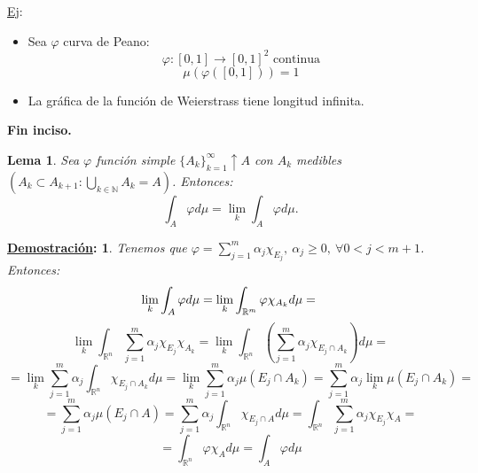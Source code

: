 \documentclass[10pt,a4paper,openright]{book}
\theoremstyle{break}
\newtheorem*{lema}{Lema}
\newtheorem*{demo}{\underline{Demostración}:}
\begin{document}
\underline{Ej}:
\begin{itemize}
    \item Sea $\varphi$ curva de Peano:
    $$\varphi: \left[0, 1\right] \rightarrow \left[0, 1\right]^2 \text{ continua}$$
    $$\mu\left(\varphi\left(\left[0, 1\right]\right)\right) = 1$$
    \item La gráfica de la función de Weierstrass tiene longitud infinita.
\end{itemize}
\textbf{Fin inciso.}
\newpage
\begin{lema}
Sea $\varphi$ función simple $\{A_k\}_{k=1}^{\infty}\uparrow A$ con $A_k$ medibles $\left(A_k \subset A_{k+1} : \bigcup_{k \in \mathbb{N}} A_k = A\right)$. Entonces:
$$\int_A \varphi d \mu = \lim_k \int_A \varphi d \mu.$$
\end{lema}
\begin{demo}
Tenemos que $\varphi = \sum_{j=1}^{m} \alpha_j \chi_{E_j},\ \alpha_j \ge 0,\ \forall 0 < j < m + 1$. Entonces:
$$\lim_k \int_A \varphi d \mu = \lim_k \int_{\mathbb{R}^m}\varphi \chi_{A_k} d \mu = \\$$
$$\lim_k \int_{\mathbb{R}^n} \sum_{j=1}^{m} \alpha_j \chi_{E_j} \chi_{A_k} = \lim_k \int_{\mathbb{R}^n} \left(\sum_{j=1}^{m} \alpha_j \chi_{E_j \cap A_k}\right) d \mu = $$
$$= \lim_k \sum_{j=1}^{m} \alpha_j \int_{\mathbb{R}^n} \chi_{E_j \cap A_k} d \mu = \lim_k \sum_{j=1}^{m} \alpha_j \mu\left(E_j \cap A_k\right) = \sum_{j=1}^{m} \alpha_j \lim_k \mu\left(E_j \cap A_k\right) = $$
$$= \sum_{j=1}^{m} \alpha_j \mu\left(E_j \cap A\right) = \sum_{j=1}^{m} \alpha_j \int_{\mathbb{R}^n} \chi_{E_j \cap A} d \mu = \int_{\mathbb{R}^n}\sum_{j=1}^{m} \alpha_j \chi_{E_j} \chi_{A} = $$
$$= \int_{\mathbb{R}^n} \varphi \chi_A d \mu = \int_A \varphi d \mu$$
\end{demo}
\end{document}
